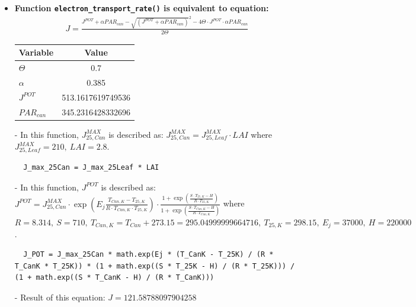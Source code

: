 \documentclass[a4paper]{article}
\numberwithin{equation}{section}
\begin{document}
\begin{itemize}
  \item \textbf{Function \texttt{electron\_transport\_rate()} is equivalent to equation:}
        \begin{align*}
          J = \frac{J^{POT} + \alpha PAR_{can} - {\sqrt{(J^{POT} + \alpha PAR_{can})}^2 - 4\Theta\cdot J^{POT}\cdot \alpha PAR_{can}}}{2 \Theta}
        \end{align*}

        \begin{table}[H]
          \centering
          \begin{tabular}{@{}lS[table-format=3.13]@{}}
            \toprule
            \textbf{Variable} & \textbf{Value}    \\
            \midrule
            \(\Theta\)        & 0.7               \\
            \(\alpha\)        & 0.385             \\
            \(J^{POT}\)       & 513.1617619749536 \\
            \(PAR_{can}\)     & 345.2316428332696 \\
            \bottomrule
          \end{tabular}
        \end{table}

  \item[-] In this function, \(J^{MAX}_{25,Can}\) is described as: \(J^{MAX}_{25,Can} = J^{MAX}_{25,Leaf} \cdot LAI\) where \(J^{MAX}_{25,Leaf} = 210,\ LAI = 2.8\).
        \begin{mdframed}[leftline=false,rightline=false,backgroundcolor=magenta!10,nobreak=true]
          \begin{verbatim}
  J_max_25Can = J_max_25Leaf * LAI
          \end{verbatim}
        \end{mdframed}
  \item[-] In this function, \(J^{POT}\) is described as: \(J^{POT} = J^{MAX}_{25,Can} \cdot \exp \left(E_j\frac{T_{Can,K}-T_{25,K}}{R\cdot T_{Can,K}\cdot T_{25,K}}\right) \cdot \frac{1 + \exp \left(\frac{S\cdot T_{25,K}-H}{R\cdot T_{25,K}}\right)}{1 + \exp \left(\frac{S\cdot T_{Can,K}-H}{R\cdot T_{Can,K}}\right)}\) where \(R = 8.314,\ S = 710,\ T_{Can,K} = T_{Can} + 273.15 = 295.04999999664716,\ T_{25,K} = 298.15,\ E_j = 37000,\ H = 220000\).
        \begin{mdframed}[leftline=false,rightline=false,backgroundcolor=magenta!10,nobreak=true]
          \begin{verbatim}
  J_POT = J_max_25Can * math.exp(Ej * (T_CanK - T_25K) / (R * T_CanK * T_25K)) * (1 + math.exp((S * T_25K - H) / (R * T_25K))) / (1 + math.exp((S * T_CanK - H) / (R * T_CanK)))
          \end{verbatim}
        \end{mdframed}
  \item[-] Result of this equation: \(J = 121.58788097904258\)


\end{itemize}
\end{document}
